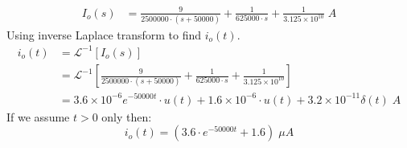 \begin{enumerate}
{		\begin{align*}
		I_o(s) &= \frac{9}{2500000 \cdot(s+50000)} + \frac{1}{625000 \cdot s} 
		+ \frac{1}{3.125 \times 10^{10}} \; A
		\end{align*}
		Using inverse Laplace transform to find $i_o(t)$.
		\begin{align*}
		i_o(t) &= \mathcal{L}^{-1}\left[ I_o(s) \right]\\
		&= \mathcal{L}^{-1} \left[ \frac{9}{2500000 \cdot(s+50000)} 
		+ \frac{1}{625000 \cdot s} + \frac{1}{3.125 \times 10^{10}} \right]\\
		&= 3.6 \times 10^{-6} e^{-50000t} \cdot u(t) + 1.6 \times 10^{-6} \cdot u(t) + 3.2 \times 10^{-11} \delta(t) \; A
		\end{align*}
		If we assume $t>0$ only then:
		$$ i_o(t) = (3.6 \cdot e^{-50000t} + 1.6) \; \mu A $$
	}
\end{enumerate}